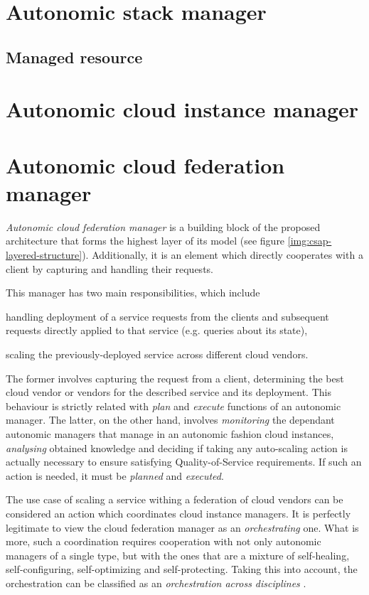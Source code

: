 \section{Autonomic stack manager}
\subsection{Managed resource}



\section{Autonomic cloud instance manager}

\section{Autonomic cloud federation manager}
\emph{Autonomic cloud federation manager} is a building block of the proposed architecture that forms the highest layer of its model (see figure \ref{img:csap-layered-structure}). Additionally, it is an element which directly cooperates with a client by capturing and handling their requests.

This manager has two main responsibilities, which include
\begin{inparaenum}[1)]
\item handling deployment of a service requests from the clients and subsequent requests directly applied to that service (e.g. queries about its state), 
\item scaling the previously-deployed service across different cloud vendors.
\end{inparaenum}
The former involves capturing the request from a client, determining the best cloud vendor or vendors for the described service and its deployment. This behaviour is strictly related with \emph{plan} and \emph{execute} functions of an autonomic manager. The latter, on the other hand, involves \emph{monitoring} the dependant autonomic managers that manage in an autonomic fashion cloud instances, \emph{analysing} obtained knowledge and deciding if taking any auto-scaling action is actually necessary to ensure satisfying Quality-of-Service requirements. If such an action is needed, it must be \emph{planned} and \emph{executed}.

The use case of scaling a service withing a federation of cloud vendors can be considered an action which coordinates cloud instance managers. It is perfectly legitimate to view the cloud federation manager as an \emph{orchestrating} one. What is more, such a coordination requires cooperation with not only autonomic managers of a single type, but with the ones that are a mixture of self-healing, self-configuring, self-optimizing and self-protecting. Taking this into account, the orchestration can be classified as an \emph{orchestration across disciplines} \cite{IBM06}.

